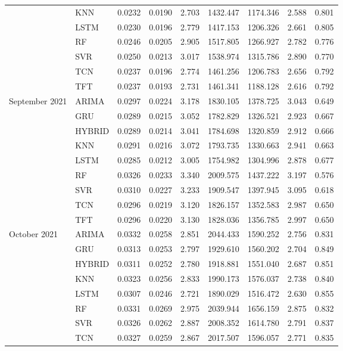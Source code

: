 \begin{tabular}{lllllllll}
 & KNN & 0.0232 & 0.0190 & 2.703 & 1432.447 & 1174.346 & 2.588 & 0.801 \\
 & LSTM & 0.0230 & 0.0196 & 2.779 & 1417.153 & 1206.326 & 2.661 & 0.805 \\
 & RF & 0.0246 & 0.0205 & 2.905 & 1517.805 & 1266.927 & 2.782 & 0.776 \\
 & SVR & 0.0250 & 0.0213 & 3.017 & 1538.974 & 1315.786 & 2.890 & 0.770 \\
 & TCN & 0.0237 & 0.0196 & 2.774 & 1461.256 & 1206.783 & 2.656 & 0.792 \\
 & TFT & 0.0237 & 0.0193 & 2.731 & 1461.341 & 1188.128 & 2.616 & 0.792 \\
September 2021 & ARIMA & 0.0297 & 0.0224 & 3.178 & 1830.105 & 1378.725 & 3.043 & 0.649 \\
 & GRU & 0.0289 & 0.0215 & 3.052 & 1782.829 & 1326.521 & 2.923 & 0.667 \\
 & HYBRID & 0.0289 & 0.0214 & 3.041 & 1784.698 & 1320.859 & 2.912 & 0.666 \\
 & KNN & 0.0291 & 0.0216 & 3.072 & 1793.735 & 1330.663 & 2.941 & 0.663 \\
 & LSTM & 0.0285 & 0.0212 & 3.005 & 1754.982 & 1304.996 & 2.878 & 0.677 \\
 & RF & 0.0326 & 0.0233 & 3.340 & 2009.575 & 1437.222 & 3.197 & 0.576 \\
 & SVR & 0.0310 & 0.0227 & 3.233 & 1909.547 & 1397.945 & 3.095 & 0.618 \\
 & TCN & 0.0296 & 0.0219 & 3.120 & 1826.157 & 1352.583 & 2.987 & 0.650 \\
 & TFT & 0.0296 & 0.0220 & 3.130 & 1828.036 & 1356.785 & 2.997 & 0.650 \\
October 2021 & ARIMA & 0.0332 & 0.0258 & 2.851 & 2044.433 & 1590.252 & 2.756 & 0.831 \\
 & GRU & 0.0313 & 0.0253 & 2.797 & 1929.610 & 1560.202 & 2.704 & 0.849 \\
 & HYBRID & 0.0311 & 0.0252 & 2.780 & 1918.881 & 1551.040 & 2.687 & 0.851 \\
 & KNN & 0.0323 & 0.0256 & 2.833 & 1990.173 & 1576.037 & 2.738 & 0.840 \\
 & LSTM & 0.0307 & 0.0246 & 2.721 & 1890.029 & 1516.472 & 2.630 & 0.855 \\
 & RF & 0.0331 & 0.0269 & 2.975 & 2039.944 & 1656.159 & 2.875 & 0.832 \\
 & SVR & 0.0326 & 0.0262 & 2.887 & 2008.352 & 1614.780 & 2.791 & 0.837 \\
 & TCN & 0.0327 & 0.0259 & 2.867 & 2017.507 & 1596.057 & 2.771 & 0.835 \\

\end{tabular}
